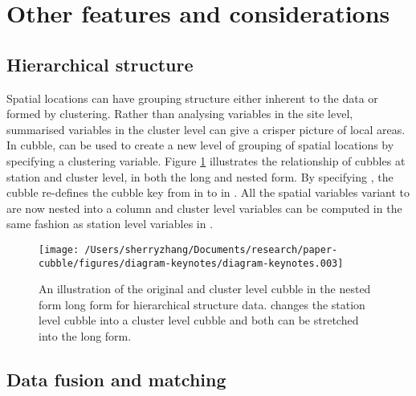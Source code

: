 \documentclass[
]{jss}
\begin{document}
\hypertarget{others}{%
\section{Other features and considerations}\label{others}}

\hypertarget{hierarchical-structure}{%
\subsection{Hierarchical structure}\label{hierarchical-structure}}

Spatial locations can have grouping structure either inherent to the data or formed by clustering. Rather than analysing variables in the site level, summarised variables in the cluster level can give a crisper picture of local areas. In cubble,  can be used to create a new level of grouping of spatial locations by specifying a clustering variable. Figure \ref{fig:illu-hier} illustrates the relationship of cubbles at station and cluster level, in both the long and nested form. By specifying , the cubble re-defines the cubble key from  in  to  in . All the spatial variables variant to  are now nested into a  column and cluster level variables can be computed in the same fashion as station level variables in .

\begin{CodeChunk}
\begin{figure}

{\centering \texttt{[image: /Users/sherryzhang/Documents/research/paper-cubble/figures/diagram-keynotes/diagram-keynotes.003]} 

}

\caption[An illustration of the original and cluster level cubble in the nested form long form for hierarchical structure data]{An illustration of the original and cluster level cubble in the nested form long form for hierarchical structure data.  changes the station level cubble into a cluster level cubble and both can be stretched into the long form.}\label{fig:illu-hier}
\end{figure}
\end{CodeChunk}

\hypertarget{data-fusion-and-matching}{%
\subsection{Data fusion and matching}\label{data-fusion-and-matching}}
\end{document}
